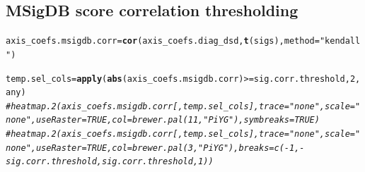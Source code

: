 \documentclass{article}\usepackage[]{graphicx}\usepackage[]{color}
\makeatletter
\newcommand{\hlnum}[1]{\textcolor[rgb]{0.686,0.059,0.569}{#1}}%
\newcommand{\hlstr}[1]{\textcolor[rgb]{0.192,0.494,0.8}{#1}}%
\newcommand{\hlcom}[1]{\textcolor[rgb]{0.678,0.584,0.686}{\textit{#1}}}%
\newcommand{\hlopt}[1]{\textcolor[rgb]{0,0,0}{#1}}%
\newcommand{\hlstd}[1]{\textcolor[rgb]{0.345,0.345,0.345}{#1}}%
\newcommand{\hlkwb}[1]{\textcolor[rgb]{0.69,0.353,0.396}{#1}}%
\newcommand{\hlkwc}[1]{\textcolor[rgb]{0.333,0.667,0.333}{#1}}%
\newcommand{\hlkwd}[1]{\textcolor[rgb]{0.737,0.353,0.396}{\textbf{#1}}}%
\newenvironment{kframe}{%
 \def\at@end@of@kframe{}%
 \ifinner\ifhmode%
  \def\at@end@of@kframe{\end{minipage}}%
  \begin{minipage}{\columnwidth}%
 \fi\fi%
 \def\FrameCommand##1{\hskip\@totalleftmargin \hskip-\fboxsep
 \colorbox{shadecolor}{##1}\hskip-\fboxsep
     \hskip-\linewidth \hskip-\@totalleftmargin \hskip\columnwidth}%
 \MakeFramed {\advance\hsize-\width
   \@totalleftmargin\z@ \linewidth\hsize
   \@setminipage}}%
 {\par\unskip\endMakeFramed%
 \at@end@of@kframe}
\newenvironment{knitrout}{}{} %
\makeatother
\begin{document}
\subsection{MSigDB score correlation thresholding}
\begin{knitrout}
\color{fgcolor}\begin{kframe}
\begin{alltt}
\hlstd{axis_coefs.msigdb.corr} \hlkwb{=} \hlkwd{cor}\hlstd{(axis_coefs.diag_dsd,} \hlkwd{t}\hlstd{(sigs),} \hlkwc{method} \hlstd{=} \hlstr{"kendall"}\hlstd{)}

\hlstd{temp.sel_cols} \hlkwb{=} \hlkwd{apply}\hlstd{(}\hlkwd{abs}\hlstd{(axis_coefs.msigdb.corr)} \hlopt{>=} \hlstd{sig.corr.threshold,} \hlnum{2}\hlstd{, any)}
\hlcom{#heatmap.2(axis_coefs.msigdb.corr[, temp.sel_cols], trace = "none", scale = "none", useRaster = TRUE, col = brewer.pal(11, "PiYG"), symbreaks = TRUE)}
\hlcom{#heatmap.2(axis_coefs.msigdb.corr[, temp.sel_cols], trace = "none", scale = "none", useRaster = TRUE, col = brewer.pal(3, "PiYG"), breaks = c(-1, -sig.corr.threshold, sig.corr.threshold, 1))}


\end{alltt}
\end{kframe}
\end{knitrout}
\end{document}
